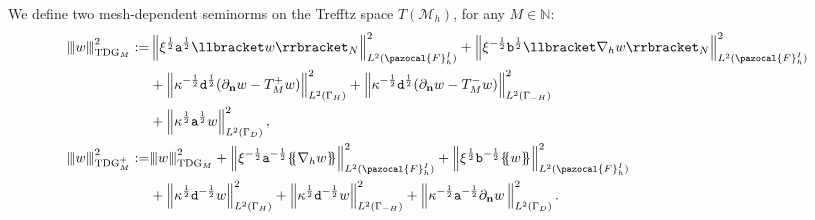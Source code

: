 \documentclass[a4paper,10pt]{article}
\newcommand{\dlgraffa}{\{ \hspace{-0.1cm} \{}
\newcommand{\drgraffa}{\} \hspace{-0.1cm} \}}
\newcommand{\vertiii}[1]{{\left\vert\kern-0.25ex\left\vert\kern-0.25ex\left\vert #1 \right\vert\kern-0.25ex\right\vert\kern-0.25ex\right\vert}}
\newcommand{\IN}{{\mathbb N}}
\newcommand{\bn}{{\mathbf n}}
\newcommand{\Mh}{{\mathcal M_h}}
\newcommand{\pa}{{\mathtt{a}}}
\newcommand{\pb}{{\mathtt{b}}}
\newcommand{\pd}{{\mathtt{d}}}
\newcommand{\GD}{{\Gamma_D}}
\newcommand{\GH}{{\Gamma_H}}
\newcommand{\GmH}{{\Gamma_{-H}}}
\newcommand{\FhI}{\pazocal{F}_h^I}
\begin{document}
We define two mesh-dependent seminorms on the Trefftz space $T(\Mh)$, for any $M \in \IN$:
\begin{align} \nonumber
\vertiii{w}_{\mathrm{TDG}_M}^2 := & \left\| \xi^{\frac{1}{2}} \pa^{\frac{1}{2}} \llbracket w \rrbracket_N \right\|^2_{L^2(\FhI)} + \left\| \xi^{-\frac{1}{2}} \pb^{\frac{1}{2}} \llbracket \nabla_h w \rrbracket_N \right\|^2_{L^2(\FhI)}  \\ \nonumber
& + \left\| \kappa^{-\frac{1}{2}} \pd^{\frac{1}{2}} ( \partial_\bn w - T_M^+ w ) \right\|^2_{L^2(\GH)} + \left\| \kappa^{-\frac{1}{2}} \pd^{\frac{1}{2}} ( \partial_\bn w - T_M^- w ) \right\|^2_{L^2(\GmH)} \\ \label{normaTDG}
&+ \left\| \kappa^{\frac{1}{2}} \pa^{\frac{1}{2}} w \right\|^2_{L^2(\GD)},
\\ \nonumber
\vertiii{w}_{\mathrm{TDG}_M^+}^2 := & \vertiii{w}_{\mathrm{TDG}_M}^2  +\left\| \xi^{-\frac{1}{2}} \pa^{-\frac{1}{2}} \dlgraffa \nabla_h w \drgraffa \right\|^2_{L^2(\FhI)} + \left\| \xi^{\frac{1}{2}} \pb^{-\frac{1}{2}} \dlgraffa w \drgraffa \right\|^2_{L^2(\FhI)} \\ \label{normaTDG+}
& +  \left\| \kappa^{\frac{1}{2}} \pd^{-\frac{1}{2}} w \right\|^2_{L^2(\GH)} +  \left\| \kappa^{\frac{1}{2}} \pd^{-\frac{1}{2}} w \right\|^2_{L^2(\GmH)} + \left\| \kappa^{-\frac{1}{2}} \pa^{-\frac{1}{2}} \partial_\bn w \, \right\|^2_{L^2(\GD)}.
\end{align}
\end{document}
